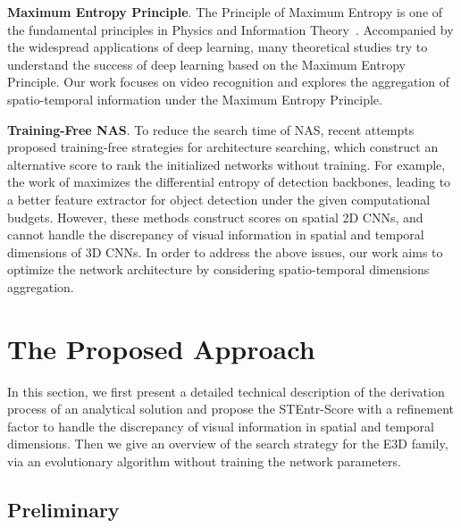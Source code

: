 \documentclass{article} \usepackage{iclr2023_conference,times}
\begin{document}
\noindent\textbf{Maximum Entropy Principle}.
The Principle of Maximum Entropy is one of the fundamental principles in Physics and Information Theory~\citep{shannon1948,theory1,theory2,theory3}. Accompanied by the widespread applications of deep learning, many theoretical studies \citep{saxe2019information,chan2021redunet,yu2020learning,sun2022mae} try to understand the success of deep learning based on the Maximum Entropy Principle.
Our work focuses on video recognition and explores the aggregation of spatio-temporal information under the Maximum Entropy Principle. 



\noindent\textbf{Training-Free NAS}.
To reduce the search time of NAS, recent attempts \citep{naswot,ntk,syn,lin2021zen,sunentropy,sun2022mae,zhou2022training,chen2022nasbenchzero,DBLP:journals/corr/abs-2006-14090} proposed training-free strategies for architecture searching, which construct an alternative score to rank the initialized networks without training.
For example, the work of \citep{sun2022mae} maximizes the differential entropy of detection backbones, leading to a better feature extractor for object detection under the given computational budgets.
However, these methods construct scores on spatial 2D CNNs, and cannot handle the discrepancy of visual information in spatial and temporal dimensions of 3D CNNs.
In order to address the above issues, our work aims to optimize the network architecture by considering spatio-temporal dimensions aggregation.











\section{The Proposed Approach}
In this section, we first present a detailed technical description of the derivation process of an analytical solution and propose the STEntr-Score with a refinement factor to handle the discrepancy of visual information in spatial and temporal dimensions.
Then we give an overview of the search strategy for the E3D family, via an evolutionary algorithm without training the network parameters.



\subsection{Preliminary}
\end{document}
